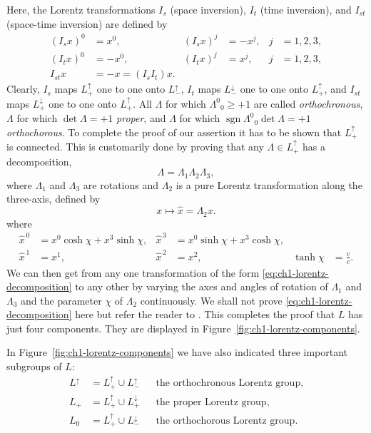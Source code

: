 Here, the Lorentz transformations $I_s$ (space inversion), $I_t$ (time
inversion), and $I_{st}$ (space-time inversion) are defined by
\begin{equation}
\begin{aligned}
  (I_sx)^0&=x^0,& (I_sx)^j&=-x^j,& j&=1,2,3,\\
  (I_tx)^0&=-x^0,& (I_tx)^j&=x^j,& j&=1,2,3,\\
  I_{st}x&=-x=(I_sI_t)x .
\end{aligned}
\tag{1-8}\label{eq:ch1-inversions}
\end{equation}
Clearly, $I_s$ maps $L^\uparrow_+$ one to one onto $L^\uparrow_-$,
$I_t$ maps $L^\downarrow_-$ one to one onto $L^\uparrow_+$, and $I_{st}$
maps $L^\downarrow_+$ one to one onto $L^\uparrow_+$. All $\Lambda$ for which
$\Lambda^0{}_0\geq+1$ are called \emph{orthochronous}, $\Lambda$ for which
$\det\Lambda=+1$ \emph{proper}, and $\Lambda$ for which
$\operatorname{sgn}\Lambda^0{}_0\det\Lambda=+1$ \emph{orthochorous}. To complete the
proof of our assertion it has to be shown that $L^\uparrow_+$ is connected.
This is customarily done by proving that any $\Lambda\in L^\uparrow_+$ has a
decomposition,
\begin{equation}
  \Lambda=\Lambda_1\Lambda_2\Lambda_3,
  \tag{1-9}\label{eq:ch1-lorentz-decomposition}
\end{equation}
where $\Lambda_1$ and $\Lambda_3$ are rotations and $\Lambda_2$ is a pure Lorentz
transformation along the three-axis, defined by
\[
  x\longmapsto\widehat{x}=\Lambda_2x .
\]
where
\begin{equation}
\begin{aligned}
  \widehat{x}^{\,0}&=x^0\cosh\chi+x^3\sinh\chi,&
  \widehat{x}^{\,3}&=x^0\sinh\chi+x^3\cosh\chi,\\
  \widehat{x}^{\,1}&=x^1,&
  \widehat{x}^{\,2}&=x^2,&
  \tanh\chi&=\frac{v}{c}.
\end{aligned}
\tag{1-10}\label{eq:ch1-boost}
\end{equation}
We can then get from any one transformation of the form \eqref{eq:ch1-lorentz-decomposition} to any other by
varying the axes and angles of rotation of $\Lambda_1$ and $\Lambda_3$ and
the parameter $\chi$ of $\Lambda_2$ continuously. We shall not prove \eqref{eq:ch1-lorentz-decomposition}
here but refer the
reader to \cite{ref:1.7}. This completes the
proof that $L$ has just four components. They are displayed in
Figure~\ref{fig:ch1-lorentz-components}.

In Figure~\ref{fig:ch1-lorentz-components} we have also indicated three
important subgroups of $L$:
\[
\begin{aligned}
  L^\uparrow&=L^\uparrow_+\cup L^\uparrow_-
    &&\text{the orthochronous Lorentz group},\\
  L_+&=L^\uparrow_+\cup L^\downarrow_+
    &&\text{the proper Lorentz group},\\
  L_0&=L^\uparrow_+\cup L^\downarrow_-
    &&\text{the orthochorous Lorentz group}.
\end{aligned}
\]

